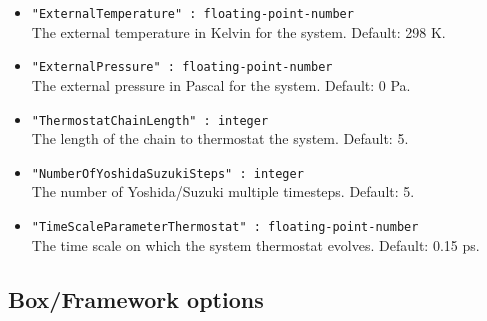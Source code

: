\begin{itemize}
\item{\verb+"ExternalTemperature" : floating-point-number+}\\
The external temperature in Kelvin for the system. Default: 298 K.
\item{\verb+"ExternalPressure" : floating-point-number+}\\
The external pressure in Pascal for the system. Default: 0 Pa.
\item{\verb+"ThermostatChainLength" : integer+}\\
The length of the chain to thermostat the system. Default: 5.
\item{\verb+"NumberOfYoshidaSuzukiSteps" : integer+}\\
The number of Yoshida/Suzuki multiple timesteps. Default: 5.
\item{\verb+"TimeScaleParameterThermostat" : floating-point-number+}\\
The time scale on which the system thermostat evolves. Default: 0.15 ps.
\end{itemize}

\subsection{Box/Framework options}

